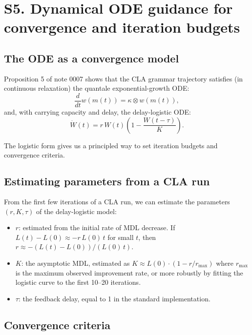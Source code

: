 \documentclass[11pt]{article}
\begin{document}
\section{S5. Dynamical ODE guidance for convergence and iteration budgets}

\subsection{The ODE as a convergence model}

Proposition 5 of note 0007 shows that the CLA grammar trajectory satisfies (in continuous relaxation) the quantale exponential-growth ODE:
\begin{equation}
  \frac{d}{dt} w(m(t)) = \kappa \otimes w(m(t)),
\end{equation}
and, with carrying capacity and delay, the delay-logistic ODE:
\begin{equation}
  \dot{W}(t) = r \, W(t) \left(1 - \frac{W(t - \tau)}{K}\right).
\end{equation}

The logistic form gives us a principled way to set iteration budgets and convergence criteria.

\subsection{Estimating parameters from a CLA run}

From the first few iterations of a CLA run, we can estimate the parameters $(r, K, \tau)$ of the delay-logistic model:
\begin{itemize}
  \item $r$: estimated from the initial rate of MDL decrease.  If $L(t) - L(0) \approx -r \, L(0) \, t$ for small $t$, then $r \approx -(L(t) - L(0)) / (L(0) \, t)$.
  \item $K$: the asymptotic MDL, estimated as $K \approx L(0) \cdot (1 - r / r_{\max})$ where $r_{\max}$ is the maximum observed improvement rate, or more robustly by fitting the logistic curve to the first 10--20 iterations.
  \item $\tau$: the feedback delay, equal to 1 in the standard implementation.
\end{itemize}

\subsection{Convergence criteria}
\end{document}
